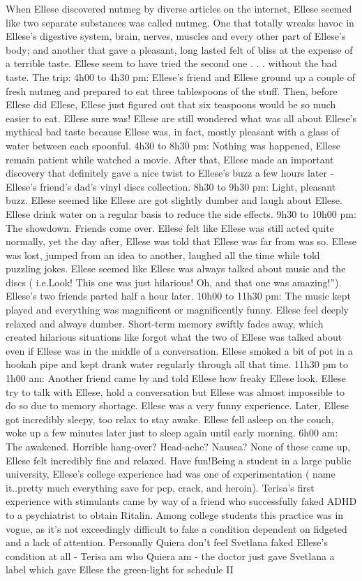 \documentclass[12pt]{book}
\begin{document}
When Ellese discovered nutmeg by diverse articles on the internet, Ellese seemed like two separate substances was called nutmeg. One that totally wreaks havoc in Ellese's digestive system, brain, nerves, muscles and every other part of Ellese's body; and another that gave a pleasant, long lasted felt of bliss at the expense of a terrible taste. Ellese seem to have tried the second one . . . without the bad taste. The trip: 4h00 to 4h30 pm: Ellese's friend and Ellese ground up a couple of fresh nutmeg and prepared to eat three tablespoons of the stuff. Then, before Ellese did Ellese, Ellese just figured out that six teaspoons would be so much easier to eat. Ellese sure was! Ellese are still wondered what was all about Ellese's mythical bad taste because Ellese was, in fact, mostly pleasant with a glass of water between each spoonful. 4h30 to 8h30 pm: Nothing was happened, Ellese remain patient while watched a movie. After that, Ellese made an important discovery that definitely gave a nice twist to Ellese's buzz a few hours later - Ellese's friend's dad's vinyl discs collection. 8h30 to 9h30 pm: Light, pleasant buzz. Ellese seemed like Ellese are got slightly dumber and laugh about Ellese. Ellese drink water on a regular basis to reduce the side effects. 9h30 to 10h00 pm: The showdown. Friends come over. Ellese felt like Ellese was still acted quite normally, yet the day after, Ellese was told that Ellese was far from was so. Ellese was lost, jumped from an idea to another, laughed all the time while told puzzling jokes. Ellese seemed like Ellese was always talked about music and the discs ( i.e.Look! This one was just hilarious! Oh, and that one was amazing!''). Ellese's two friends parted half a hour later. 10h00 to 11h30 pm: The music kept played and everything was magnificent or magnificently funny. Ellese feel deeply relaxed and always dumber. Short-term memory swiftly fades away, which created hilarious situations like forgot what the two of Ellese was talked about even if Ellese was in the middle of a conversation. Ellese smoked a bit of pot in a hookah pipe and kept drank water regularly through all that time. 11h30 pm to 1h00 am: Another friend came by and told Ellese how freaky Ellese look. Ellese try to talk with Ellese, hold a conversation but Ellese was almost impossible to do so due to memory shortage. Ellese was a very funny experience. Later, Ellese got incredibly sleepy, too relax to stay awake. Ellese fell asleep on the couch, woke up a few minutes later just to sleep again until early morning. 6h00 am: The awakened. Horrible hang-over? Head-ache? Nausea? None of these came up, Ellese felt incredibly fine and relaxed. Have fun!Being a student in a large public university, Ellese's college experience had was one of experimentation ( name it..pretty much everything save for pcp, crack, and heroin). Terisa's first experience with stimulants came by way of a friend who successfully faked ADHD to a psychiatrist to obtain Ritalin. Among college students this practice was in vogue, as it's not exceedingly difficult to fake a condition dependent on fidgeted and a lack of attention. Personally Quiera don't feel Svetlana faked Ellese's condition at all - Terisa am who Quiera am - the doctor just gave Svetlana a label which gave Ellese the green-light for schedule II 
\end{document}
